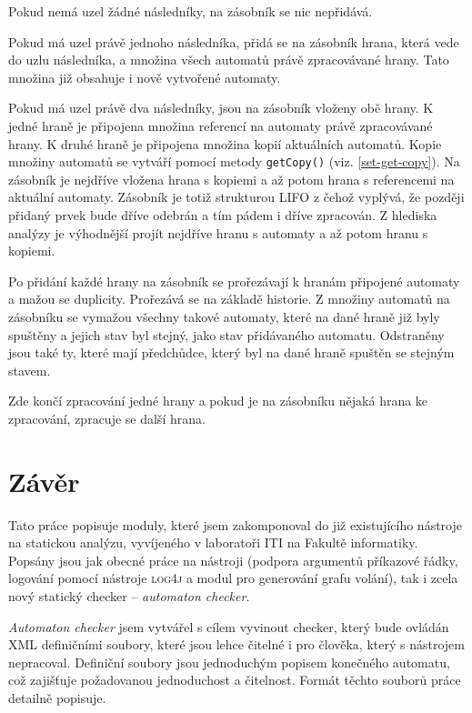 \documentclass[11pt,final,oneside]{fithesis}
\begin{document}
Pokud nemá uzel žádné následníky, na zásobník se nic nepřidává.

Pokud má uzel právě jednoho následníka, přidá se na zásobník hrana, která vede do uzlu následníka, a množina všech automatů právě zpracovávané hrany. Tato množina již obsahuje i nově vytvořené automaty.

Pokud má uzel právě dva následníky, jsou na zásobník vloženy obě hrany. K jedné hraně je připojena množina referencí na automaty právě zpracovávané hrany. K druhé hraně je připojena množina kopií aktuálních automatů. Kopie množiny automatů se vytváří pomocí metody \texttt{getCopy()} (viz. \ref{set-get-copy}). Na zásobník je nejdříve vložena hrana s kopiemi a až potom hrana s referencemi na aktuální automaty. Zásobník je totiž strukturou LIFO z čehož vyplývá, že později přidaný prvek bude dříve odebrán a tím pádem i dříve zpracován. Z hlediska analýzy je výhodnější projít nejdříve hranu s  automaty a až potom hranu s kopiemi. 

Po přidání každé hrany na zásobník se prořezávají k hranám připojené automaty a mažou se duplicity. Prořezává se na základě historie. Z množiny automatů na zásobníku se vymažou všechny takové automaty, které na dané hraně již byly spuštěny a jejich stav byl stejný, jako stav přidávaného automatu. Odstraněny jsou také ty, které mají předchůdce, který byl na dané hraně spuštěn se stejným stavem.

Zde končí zpracování jedné hrany a pokud je na zásobníku nějaká hrana ke zpracování, zpracuje se další hrana.



\chapter{Závěr}

Tato práce popisuje moduly, které jsem zakomponoval do již existujícího nástroje na statickou analýzu, vyvíjeného v laboratoři ITI na Fakultě informatiky. Popsány jsou jak obecné práce na nástroji (podpora argumentů příkazové řádky, logování pomocí nástroje \textsc{log4j} a modul pro generování grafu volání), tak i zcela nový statický checker -- \textit{automaton checker}.

\textit{Automaton checker} jsem vytvářel s cílem vyvinout checker, který bude ovládán XML definičními soubory, které jsou lehce čitelné i pro člověka, který s nástrojem nepracoval. Definiční soubory jsou jednoduchým popisem konečného automatu, což zajišťuje požadovanou jednoduchost a čitelnost. Formát těchto souborů práce detailně popisuje.
\end{document}
